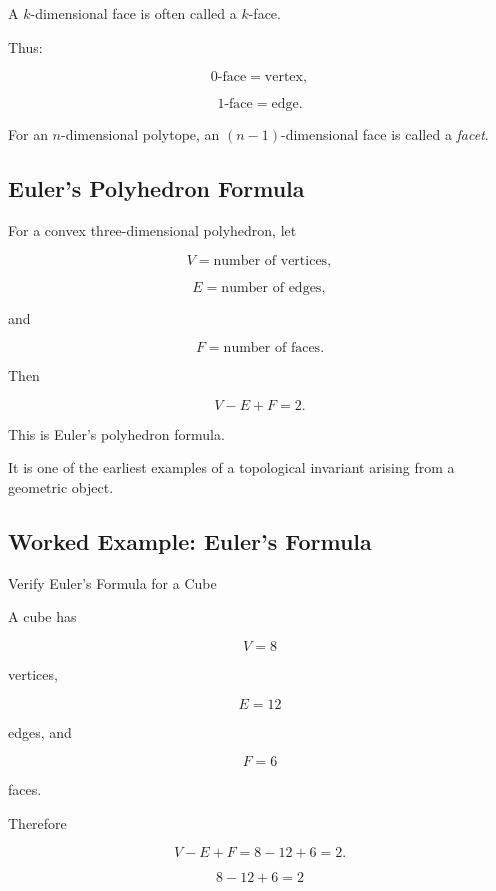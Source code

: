 A \(k\)-dimensional face is often called a \(k\)-face.

Thus:

\[
\boxed{
0\text{-face}=\text{vertex},
}
\]

\[
\boxed{
1\text{-face}=\text{edge}.
}
\]

For an \(n\)-dimensional polytope, an \((n-1)\)-dimensional face is called a
\emph{facet}.

\subsection{Euler's Polyhedron Formula}
\label{subsec:euler-polyhedron-formula}

For a convex three-dimensional polyhedron, let

\[
V=\text{number of vertices},
\]

\[
E=\text{number of edges},
\]

and

\[
F=\text{number of faces}.
\]

Then

\[
\boxed{
V-E+F=2.
}
\]

This is Euler's polyhedron formula.

It is one of the earliest examples of a topological invariant arising from
a geometric object.

\subsection{Worked Example: Euler's Formula}
\label{subsec:worked-euler-polyhedron}

\begin{workedexamplebox}{Verify Euler's Formula for a Cube}

A cube has

\[
V=8
\]

vertices,

\[
E=12
\]

edges, and

\[
F=6
\]

faces.

Therefore

\[
V-E+F
=
8-12+6
=
2.
\]

\begin{answerbox}
\[
\boxed{
8-12+6=2
}
\]
\end{answerbox}
\end{workedexamplebox}

